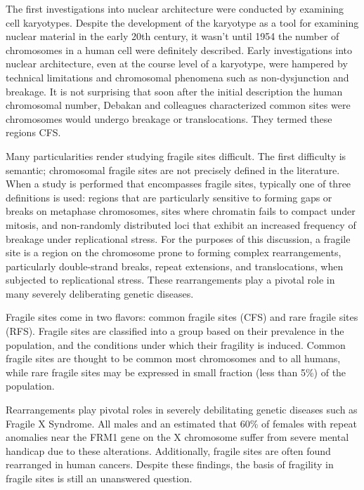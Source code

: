 The first investigations into nuclear architecture were conducted by examining cell karyotypes.  Despite the development of the karyotype as a
tool for examining nuclear material in the early 20th century\cite{levitsky1924}, it wasn't until 1954 the number of chromosomes in a human
cell were definitely described\cite{tjio1956}.  Early investigations into nuclear architecture, even at the course level of a karyotype, were
hampered by technical limitations and chromosomal phenomena such as non-dysjunction and breakage.  It is not surprising that soon after the
initial description the human chromosomal number, Debakan and colleagues characterized common sites were chromosomes would undergo breakage or
translocations.  They termed these regions \gls{CFS}\cite{leyden2008}.

Many particularities render studying fragile sites difficult.  The first difficulty is semantic; chromosomal fragile sites are not precisely
defined in the literature.  When a study is performed that encompasses fragile sites, typically one of three definitions is used: regions
that are particularly sensitive to forming gaps or breaks on metaphase chromosomes\cite{glover2005}, sites where chromatin fails to compact
under mitosis\cite{leyden2008}, and non-randomly distributed loci that exhibit an increased frequency of breakage under replicational
stress\cite{franchitto2013}.  For the purposes of this discussion, a \gls{fragile site} is a region on the chromosome prone to
forming complex rearrangements, particularly double-strand breaks, repeat extensions, and translocations, when subjected to replicational stress.
These rearrangements play a pivotal role in many severely deliberating genetic diseases.

Fragile sites come in two flavors: common fragile sites (CFS) and rare fragile sites (RFS).  Fragile sites are classified into a group based on their
prevalence in the population, and the conditions under which their fragility is induced\cite{leyden2008}.  Common fragile sites are thought to be common
most chromosomes and to all humans, while rare fragile sites may be expressed in small fraction (less than 5\%) of the population\cite{wells2006}.

Rearrangements play pivotal roles in severely debilitating genetic diseases such as Fragile X Syndrome.  All males and an estimated that 60\% of females
with repeat anomalies near the FRM1 gene on the X chromosome suffer from severe mental handicap due to these alterations\cite{sutherland1995}. Additionally,
fragile sites are often found rearranged in human cancers\cite{glover2005}.  Despite these findings, the basis of fragility in fragile sites is still an
unanswered question.
